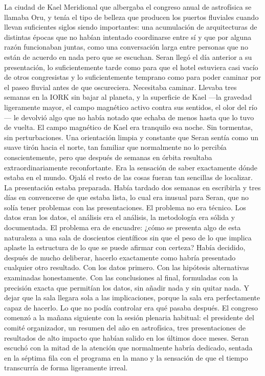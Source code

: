 \documentclass[11pt,a5paper,twoside]{book}
\begin{document}
La ciudad de Kael Meridional que albergaba el congreso anual de astrofísica se llamaba Oru, y tenía el tipo de belleza que producen los puertos fluviales cuando llevan suficientes siglos siendo importantes: una acumulación de arquitecturas de distintas épocas que no habían intentado coordinarse entre sí y que por alguna razón funcionaban juntas, como una conversación larga entre personas que no están de acuerdo en nada pero que se escuchan.
Seran llegó el día anterior a su presentación, lo suficientemente tarde como para que el hotel estuviera casi vacío de otros congresistas y lo suficientemente temprano como para poder caminar por el paseo fluvial antes de que oscureciera. Necesitaba caminar. Llevaba tres semanas en la IORK sin bajar al planeta, y la superficie de Kael —la gravedad ligeramente mayor, el campo magnético activo contra sus sentidos, el olor del río— le devolvió algo que no había notado que echaba de menos hasta que lo tuvo de vuelta.
El campo magnético de Kael era tranquilo esa noche. Sin tormentas, sin perturbaciones. Una orientación limpia y constante que Seran sentía como un suave tirón hacia el norte, tan familiar que normalmente no lo percibía conscientemente, pero que después de semanas en órbita resultaba extraordinariamente reconfortante. Era la sensación de saber exactamente dónde estaba en el mundo.
Ojalá el resto de las cosas fueran tan sencillas de localizar.
La presentación estaba preparada. Había tardado dos semanas en escribirla y tres días en convencerse de que estaba lista, lo cual era inusual para Seran, que no solía tener problemas con las presentaciones. El problema no era técnico. Los datos eran los datos, el análisis era el análisis, la metodología era sólida y documentada. El problema era de encuadre: ¿cómo se presenta algo de esta naturaleza a una sala de doscientos científicos sin que el peso de lo que implica aplaste la estructura de lo que se puede afirmar con certeza?
Había decidido, después de mucho deliberar, hacerlo exactamente como habría presentado cualquier otro resultado. Con los datos primero. Con las hipótesis alternativas examinadas honestamente. Con las conclusiones al final, formuladas con la precisión exacta que permitían los datos, sin añadir nada y sin quitar nada. Y dejar que la sala llegara sola a las implicaciones, porque la sala era perfectamente capaz de hacerlo.
Lo que no podía controlar era qué pasaba después.
El congreso comenzó a la mañana siguiente con la sesión plenaria habitual: el presidente del comité organizador, un resumen del año en astrofísica, tres presentaciones de resultados de alto impacto que habían salido en los últimos doce meses. Seran escuchó con la mitad de la atención que normalmente habría dedicado, sentada en la séptima fila con el programa en la mano y la sensación de que el tiempo transcurría de forma ligeramente irreal.
\end{document}
